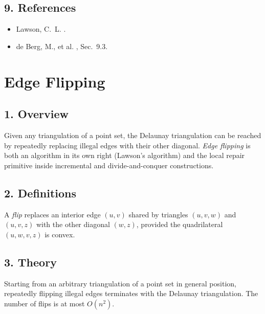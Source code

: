 \subsection{9. References}

\begin{itemize}
\item Lawson, C.~L. \cite{lawson1977}.
\item de Berg, M., et al. \cite{deberg2008}, Sec.~9.3.
\end{itemize}

\section{Edge Flipping}
\label{sec:delaunay_edge_flipping}

\subsection{1. Overview}

Given any triangulation of a point set, the Delaunay triangulation can be
reached by repeatedly replacing illegal edges with their other diagonal.
\emph{Edge flipping} is both an algorithm in its own right
(Lawson's algorithm) and the local repair primitive inside incremental and
divide-and-conquer constructions.

\subsection{2. Definitions}

\begin{definition}[Flip]\label{def:flip}
A \emph{flip} replaces an interior edge $(u,v)$ shared by triangles $(u,v,w)$
and $(u,v,z)$ with the other diagonal $(w,z)$, provided the quadrilateral
$(u,w,v,z)$ is convex.
\end{definition}

\subsection{3. Theory}

\begin{theorem}\label{thm:flip_convergence}
Starting from an arbitrary triangulation of a point set in general position,
repeatedly flipping illegal edges terminates with the Delaunay triangulation.
The number of flips is at most $O(n^2)$.
\end{theorem}

